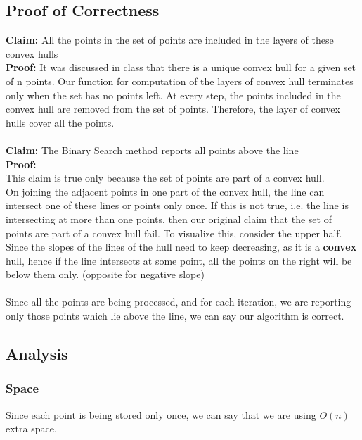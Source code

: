 \documentclass{article}
\begin{document}
    \subsection*{Proof of Correctness}
        \textbf{Claim:} All the points in the set of points are included in the layers of these convex hulls
        \\
        \textbf{Proof:} It was discussed in class that there is a unique convex hull for a given set of n points. Our function for computation of the layers of convex hull terminates only when the set has no points left. At every step, the points included in the convex hull are removed from the set of points. Therefore, the layer of convex hulls cover all the points.
        \\
        \\
        \textbf{Claim:} The Binary Search method reports all points above the line
        \\
        \textbf{Proof:}
        \\
        This claim is true only because the set of points are part of a convex hull.
        \\
        On joining the adjacent points in one part of the convex hull, the line can intersect one of these lines or points only once. If this is not true, i.e. the line is intersecting at more than one points, then our original claim that the set of points are part of a convex hull fail. To visualize this, consider the upper half. Since the slopes of the lines of the hull need to keep decreasing, as it is a \textbf{convex} hull, hence if the line intersects at some point, all the points on the right will be below them only. (opposite for negative slope)
        \\
        \\
        Since all the points are being processed, and for each iteration, we are reporting only those points which lie above the line, we can say our algorithm is correct.

    \subsection*{Analysis}
        \subsubsection*{Space}
            Since each point is being stored only once, we can say that we are using $O(n)$ extra space.
            
\end{document}
